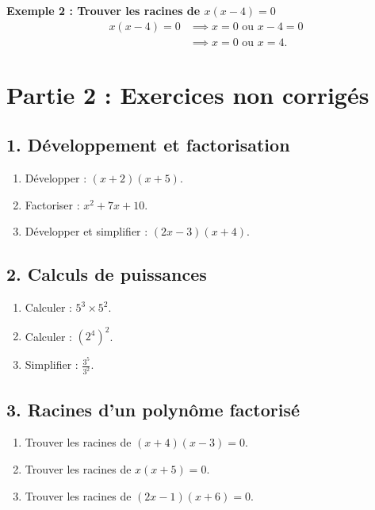 \documentclass[a4paper,12pt]{article}
\begin{document}
\textbf{Exemple 2 : Trouver les racines de $x(x-4) = 0$}
\begin{align*}
  x(x-4) = 0 &\implies x=0 \text{ ou } x-4=0 \\
  &\implies x=0 \text{ ou } x=4.
\end{align*}

\section*{Partie 2 : Exercices non corrigés}

\subsection*{1. Développement et factorisation}
\begin{enumerate}
  \item Développer : $(x+2)(x+5)$.
  \item Factoriser : $x^2 + 7x + 10$.
  \item Développer et simplifier : $(2x-3)(x+4)$.
\end{enumerate}

\subsection*{2. Calculs de puissances}
\begin{enumerate}
  \item Calculer : $5^3 \times 5^2$.
  \item Calculer : $(2^4)^2$.
  \item Simplifier : $\frac{3^5}{3^2}$.
\end{enumerate}

\subsection*{3. Racines d'un polynôme factorisé}
\begin{enumerate}
  \item Trouver les racines de $(x+4)(x-3) = 0$.
  \item Trouver les racines de $x(x+5) = 0$.
  \item Trouver les racines de $(2x-1)(x+6) = 0$.
\end{enumerate}
\end{document}
